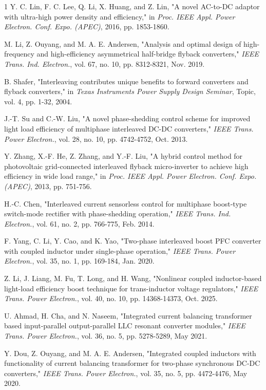 \documentclass[lettersize,journal]{IEEEtran}
\begin{document}
\begin{thebibliography}{1}
Y. C. Lin, F. C. Lee, Q. Li, X. Huang, and Z. Lin, "A novel AC-to-DC adaptor with ultra-high power density and efficiency," in \textit{Proc. IEEE Appl. Power Electron. Conf. Expo. (APEC)}, 2016, pp. 1853-1860.

M. Li, Z. Ouyang, and M. A. E. Andersen, "Analysis and optimal design of high-frequency and high-efficiency asymmetrical half-bridge flyback converters," \textit{IEEE Trans. Ind. Electron.}, vol. 67, no. 10, pp. 8312-8321, Nov. 2019.

B. Shafer, "Interleaving contributes unique benefits to forward converters and flyback converters," in \textit{Texas Instruments Power Supply Design Seminar}, Topic, vol. 4, pp. 1-32, 2004.

J.-T. Su and C.-W. Liu, "A novel phase-shedding control scheme for improved light load efficiency of multiphase interleaved DC-DC converters," \textit{IEEE Trans. Power Electron.}, vol. 28, no. 10, pp. 4742-4752, Oct. 2013.

Y. Zhang, X.-F. He, Z. Zhang, and Y.-F. Liu, "A hybrid control method for photovoltaic grid-connected interleaved flyback micro-inverter to achieve high efficiency in wide load range," in \textit{Proc. IEEE Appl. Power Electron. Conf. Expo. (APEC)}, 2013, pp. 751-756.

H.-C. Chen, "Interleaved current sensorless control for multiphase boost-type switch-mode rectifier with phase-shedding operation," \textit{IEEE Trans. Ind. Electron.}, vol. 61, no. 2, pp. 766-775, Feb. 2014.

F. Yang, C. Li, Y. Cao, and K. Yao, "Two-phase interleaved boost PFC converter with coupled inductor under single-phase operation," \textit{IEEE Trans. Power Electron.}, vol. 35, no. 1, pp. 169-184, Jan. 2020.

Z. Li, J. Liang, M. Fu, T. Long, and H. Wang, "Nonlinear coupled inductor-based light-load efficiency boost technique for trans-inductor voltage regulators," \textit{IEEE Trans. Power Electron.}, vol. 40, no. 10, pp. 14368-14373, Oct. 2025.

U. Ahmad, H. Cha, and N. Naseem, "Integrated current balancing transformer based input-parallel output-parallel LLC resonant converter modules," \textit{IEEE Trans. Power Electron.}, vol. 36, no. 5, pp. 5278-5289, May 2021.

Y. Dou, Z. Ouyang, and M. A. E. Andersen, "Integrated coupled inductors with functionality of current balancing transformer for two-phase synchronous DC-DC converters," \textit{IEEE Trans. Power Electron.}, vol. 35, no. 5, pp. 4472-4476, May 2020.


\end{thebibliography}
\end{document}
